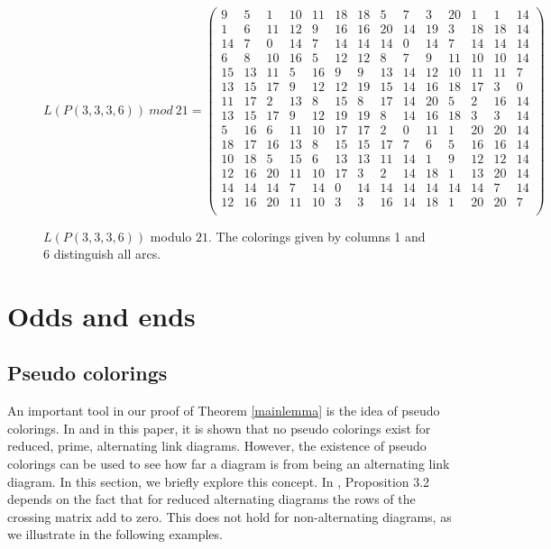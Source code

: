\documentclass[11pt]{amsart}
\begin{document}
\begin{figure}
$L(P(3,3,3,6)) \ mod \ 21=\left(
\begin{array}{cccccccccccccc}
 9 & 5 & 1 & 10 & 11 & 18 & 18 & 5 & 7 & 3 & 20 & 1 & 1 & 14 \\
 1 & 6 & 11 & 12 & 9 & 16 & 16 & 20 & 14 & 19 & 3 & 18 & 18 & 14 \\
 14 & 7 & 0 & 14 & 7 & 14 & 14 & 14 & 0 & 14 & 7 & 14 & 14 & 14 \\
 6 & 8 & 10 & 16 & 5 & 12 & 12 & 8 & 7 & 9 & 11 & 10 & 10 & 14 \\
 15 & 13 & 11 & 5 & 16 & 9 & 9 & 13 & 14 & 12 & 10 & 11 & 11 & 7 \\
 13 & 15 & 17 & 9 & 12 & 12 & 19 & 15 & 14 & 16 & 18 & 17 & 3 & 0 \\
 11 & 17 & 2 & 13 & 8 & 15 & 8 & 17 & 14 & 20 & 5 & 2 & 16 & 14 \\
 13 & 15 & 17 & 9 & 12 & 19 & 19 & 8 & 14 & 16 & 18 & 3 & 3 & 14 \\
 5 & 16 & 6 & 11 & 10 & 17 & 17 & 2 & 0 & 11 & 1 & 20 & 20 & 14 \\
 18 & 17 & 16 & 13 & 8 & 15 & 15 & 17 & 7 & 6 & 5 & 16 & 16 & 14 \\
 10 & 18 & 5 & 15 & 6 & 13 & 13 & 11 & 14 & 1 & 9 & 12 & 12 & 14 \\
 12 & 16 & 20 & 11 & 10 & 17 & 3 & 2 & 14 & 18 & 1 & 13 & 20 & 14 \\
 14 & 14 & 14 & 7 & 14 & 0 & 14 & 14 & 14 & 14 & 14 & 14 & 7 & 14 \\
 12 & 16 & 20 & 11 & 10 & 3 & 3 & 16 & 14 & 18 & 1 & 20 & 20 & 7 \\
\end{array}
\right)$
\caption{$L(P(3,3,3,6))$ modulo $21$. The colorings given by columns 1 and 6 distinguish all arcs.}\label{coloringpretzel2}
\end{figure} 

\section{Odds and ends}\label{odds}

\subsection{Pseudo colorings}

An important tool in our proof of Theorem \ref{mainlemma} is the idea of pseudo colorings. In \cite{MS} and in this paper, it is shown that no pseudo colorings exist for reduced, prime, alternating link diagrams. However, the existence of pseudo colorings can be used to see how far a diagram is from being an alternating link diagram. In this section, we briefly explore this concept. In \cite{MS}, Proposition 3.2 depends on the fact that for reduced alternating diagrams the rows of the crossing matrix add to zero. This does not hold for non-alternating diagrams, as we illustrate in the following examples.
\end{document}
